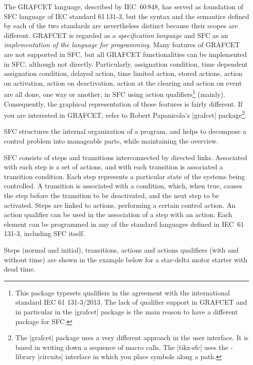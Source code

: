 \documentclass[a4paper]{ltxdoc}
\begin{document}
The GRAFCET language, described by IEC~60\,848, has served as foundation of SFC
language of IEC standard 61\,131-3, but the syntax and the semantics defined by each of the two standards are nevertheless distinct because their scopes are different. GRAFCET is regarded as a \emph{specification language} and SFC as an \emph{implementation of the language for programming}. Many features of GRAFCET are not supported in SFC, but all GRAFCET functionalities can be implemented in SFC, although not directly. Particularly, assignation condition, time dependent assignation condition, delayed action, time limited action, stored actions, action on activation, action on deactivation, action at the clearing and action on event are all done, one way or another, in SFC using action qualifiers\footnote{This package typesets qualifiers in the agreement with the international standard IEC 61 131-3/2013.  The lack of qualifier support in GRAFCET and in particular in the |grafcet| package is the main reason to have a different package for SFC.} (mainly). Consequently, the graphical representation of those features is fairly different. If you are interested in GRAFCET, refer to Robert Papanicola's |grafcet| package\footnote{The |grafcet| package uses a very different approach in the user interface. It is based in writing down a sequence of macro calls. The |tikz-sfc| uses the \tikzname-library |circuits| interface in which you place symbols along a path.}.

SFC structures the internal organization of a program, and helps to decompose a control problem into manageable parts, while maintaining the overview.

SFC consists of steps and transitions interconnected by directed links. Associated with each step is a set of actions, and with each transition is associated a transition condition. Each step represents a particular state of the systems being controlled. A transition is associated with a condition, which, when true, causes the step before the transition to be deactivated, and the next step to be activated. Steps are linked to actions, performing a certain control action. An action qualifier can be used in the association of a step with an action. Each element can be programmed in any of the standard languages defined in IEC~61\,131-3, including SFC itself.

Steps (normal and initial), transitions, actions and actions qualifiers (with and without time) are shown in the example below for a star-delta motor starter with dead time.
\end{document}
